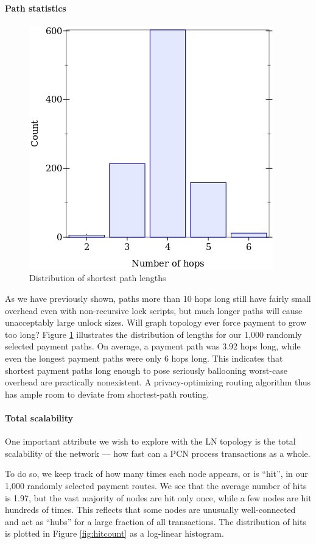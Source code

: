 \documentclass[USenglish,oneside,twocolumn]{article}
\begin{document}
\paragraph*{Path statistics}

\begin{figure}[H]
    \centering
    \includegraphics[width=0.66\linewidth]{graphics/hops.png}
    \caption{Distribution of shortest path lengths}
    \label{fig:hops}
\end{figure}

As we have previously shown, paths more than 10 hops long still have fairly small overhead even with non-recursive lock scripts, but much longer paths will cause unacceptably large unlock sizes. Will graph topology ever force payment to grow too long? Figure \ref{fig:hops} illustrates the distribution of lengths for our 1,000 randomly selected payment paths. On average, a payment path was 3.92 hops long, while even the longest payment paths were only 6 hops long. This indicates that shortest payment paths long enough to pose seriously ballooning worst-case overhead are practically nonexistent. A privacy-optimizing routing algorithm thus has ample room to deviate from shortest-path routing.

\paragraph*{Total scalability}

One important attribute we wish to explore with the LN topology is the total scalability of the network --- how fast can a PCN process transactions as a whole.

To do so, we keep track of how many times each node appears, or is ``hit'', in our 1,000 randomly selected payment routes. We see that the average number of hits is 1.97, but the vast majority of nodes are hit only once, while a few nodes are hit hundreds of times. This reflects that some nodes are unusually well-connected and act as ``hubs'' for a large fraction of all transactions. The distribution of hits is plotted in Figure \ref{fig:hitcount} as a log-linear histogram.
\end{document}
